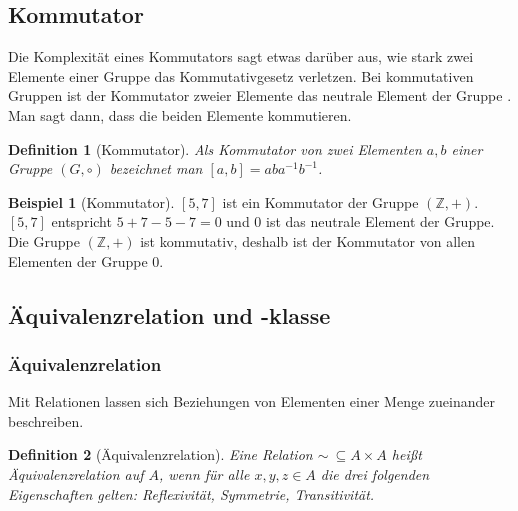 \documentclass[12pt,a4paper, usenames, dvipsnames]{article}
\theoremstyle{mystyle}
\newtheorem{definition}{Definition}
\theoremstyle{definition}
\newtheorem{bsp}{Beispiel}[definition]
\begin{document}
%
%
%
%
%
%
%
%
%
%
%
%

\subsection{Kommutator} 
 \label{Abschnitt_Kommutator}
Die Komplexität eines Kommutators sagt etwas darüber aus, wie stark zwei Elemente einer Gruppe das Kommutativgesetz verletzen. Bei kommutativen Gruppen ist der Kommutator zweier Elemente das neutrale Element der Gruppe \cite{TD}. Man sagt dann, dass die beiden Elemente kommutieren. 


\begin{definition}[Kommutator]
Als Kommutator von zwei Elementen $a, b$ einer Gruppe $(G, \circ)$  bezeichnet man $[a,b] = aba^{-1}b^{-1}$.
\end{definition}


\begin{bsp}[Kommutator]

$[5,7]$ ist ein Kommutator der Gruppe $(\mathbb{Z}, +)$. $[5,7]$ entspricht $5+7-5-7 = 0$ und $0$ ist das neutrale Element der Gruppe. Die Gruppe $(\mathbb{Z}, +)$ ist kommutativ, deshalb ist der Kommutator von allen Elementen der Gruppe $0$.

\end{bsp}
%
%
%
%
%
%
%
%
%
%
%
%
%

\subsection{Äquivalenzrelation und -klasse}

 
\subsubsection*{Äquivalenzrelation}

 \label{Abschnitt_Äquivalenrelationen}

Mit Relationen lassen sich Beziehungen von Elementen einer Menge zueinander beschreiben.

\begin{definition}[Äquivalenzrelation]
Eine Relation $\sim \ \subseteq A \times A$ heißt Äquivalenzrelation auf $A$, wenn für alle $x, y, z \in A$ die drei folgenden Eigenschaften gelten: Reflexivität, Symmetrie, Transitivität.
\end{definition}
\end{document}
